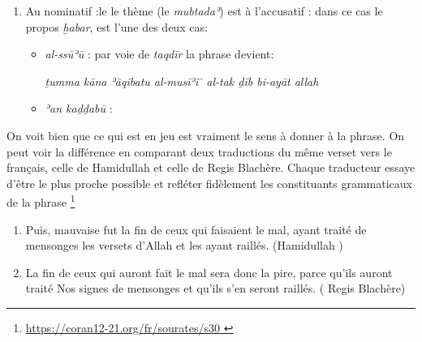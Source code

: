 \documentclass[a4paper,12pt]{report}
\begin{document}
\begin{itemize}
\begin{enumerate}
\begin{enumerate}
    le thème est alors postposé, il est  l'une des deux cas suivants :
    
   
    \begin{itemize}
      
\item \textit{al-ss\=uʾū }: les éléments qui constituent la phrase seront par voie \textit{taqd\=ir } dans cet ordre: 


\textit{ṯumma kāna \underline {al-ss\=uʾū }ʾāqibata al-llaḏīna ʾasāʾū} 



\item   \textit{ʾan kaḏḏabū} : les éléments qui constituent la phrase seront par voie \textit{taqd\=ir } dans cet ordre: 

\textit{ṯumma kāna \underline {al-takḏību  }ʾāqibata al-llaḏīna ʾasāʾū}
      
    
    \end{itemize}

    
    \item Au nominatif  :le le thème (le \textit{mubtadaʾ}) est à l'accusatif : dans ce cas le propos \textit{ḫabar},   est l'une des deux cas:

    

\begin{itemize}
    \item \textit{al-ss\=uʾū }: par voie de \textit{taqd\=ir } la phrase devient: 

   \textit{ ṯumma kāna ʾāqibatu al-musīʾi ̄
al-tak ḏīb bi-ayāt allah}


    \item  \textit{ʾan kaḏḏabū} :
\end{itemize}

    
\end{enumerate}


On voit bien que ce qui est en jeu  est vraiment le sens à donner à la phrase. On peut voir la différence en comparant deux  traductions du même verset vers le français, celle de Hamidullah et celle de Regis Blachère. Chaque traducteur essaye d'être  le plus proche possible et refléter fidèlement  les constituants grammaticaux de la phrase \footnote {\url{ https://coran12-21.org/fr/sourates/s30 } }


\begin{enumerate}
    \item  Puis, mauvaise fut la fin de ceux qui faisaient le mal, ayant traité de mensonges les versets d’Allah et les ayant raillés. (Hamidullah ) 
    \item La fin de ceux qui auront fait le mal sera donc la pire, parce qu’ils auront traité Nos signes de mensonges et qu’ils s’en seront raillés. ( Regis Blachère)
\end{enumerate}


\end{enumerate}
\end{itemize}
\end{document}
